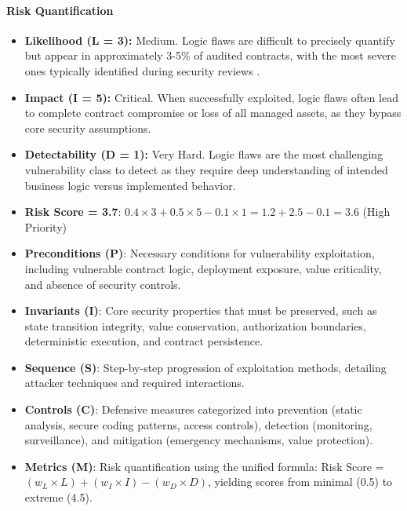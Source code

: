 \paragraph{Risk Quantification}

\begin{itemize}
\item \textbf{Likelihood (L = 3):} Medium. Logic flaws are difficult to precisely quantify but appear in approximately 3-5\% of audited contracts, with the most severe ones typically identified during security reviews \cite{zhou2023sok}.

\item \textbf{Impact (I = 5):} Critical. When successfully exploited, logic flaws often lead to complete contract compromise or loss of all managed assets, as they bypass core security assumptions.

\item \textbf{Detectability (D = 1):} Very Hard. Logic flaws are the most challenging vulnerability class to detect as they require deep understanding of intended business logic versus implemented behavior.

\item \textbf{Risk Score = 3.7}: $0.4 \times 3 + 0.5 \times 5 - 0.1 \times 1 = 1.2 + 2.5 - 0.1 = 3.6$ (High Priority)
\end{itemize}
\begin{itemize}
\item \textbf{Preconditions (P)}: Necessary conditions for vulnerability exploitation, including vulnerable contract logic, deployment exposure, value criticality, and absence of security controls.
\item \textbf{Invariants (I)}: Core security properties that must be preserved, such as state transition integrity, value conservation, authorization boundaries, deterministic execution, and contract persistence.
\item \textbf{Sequence (S)}: Step-by-step progression of exploitation methods, detailing attacker techniques and required interactions.
\item \textbf{Controls (C)}: Defensive measures categorized into prevention (static analysis, secure coding patterns, access controls), detection (monitoring, surveillance), and mitigation (emergency mechanisms, value protection).
\item \textbf{Metrics (M)}: Risk quantification using the unified formula: Risk Score = $(w_L \times L) + (w_I \times I) - (w_D \times D)$, yielding scores from minimal (0.5) to extreme (4.5).
\end{itemize}

